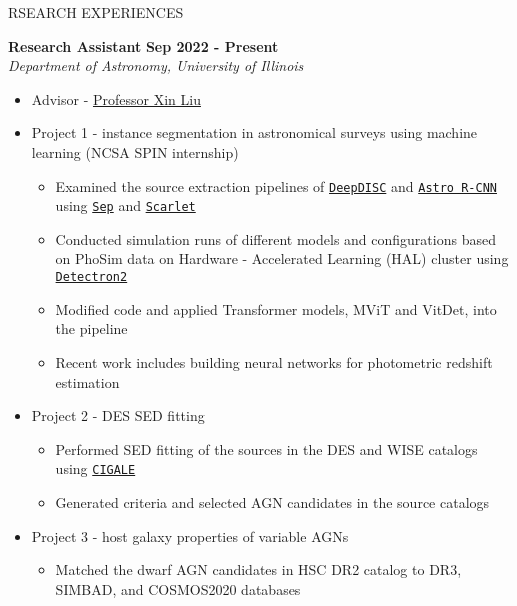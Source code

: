 \documentclass[10pt]{article} %
\begin{document}
\begin{section}{RSEARCH EXPERIENCES}

\textbf{Research Assistant} \hfill \textbf{Sep 2022 - Present} \\
\textit{Department of Astronomy, University of Illinois} 
\begin{itemize}[leftmargin=1.5em]
    \item Advisor - \href{mailto:xinliuxl@illinois.edu}{Professor Xin Liu}
    \item Project 1 - instance segmentation in astronomical surveys using machine learning (NCSA SPIN internship) %
    \begin{itemize}[leftmargin=1.5em]
        \item Examined the source extraction pipelines of \href{https://github.com/burke86/deepdisc}{\texttt{DeepDISC}} and \href{https://github.com/burke86/astro_rcnn}{\texttt{Astro R-CNN}} using \href{https://github.com/kbarbary/sep/tree/v1.1.x}{\texttt{Sep}} and \href{https://github.com/pmelchior/scarlet}{\texttt{Scarlet}}
        \item Conducted simulation runs of different models and configurations based on PhoSim data on Hardware - Accelerated Learning (HAL) cluster using \href{https://github.com/facebookresearch/detectron2}{\texttt{Detectron2}}
        \item Modified code and applied Transformer models, MViT and VitDet, into the pipeline
        \item Recent work includes building neural networks for photometric redshift estimation 
    \end{itemize}
    \item Project 2 - DES SED fitting %
    \begin{itemize}[leftmargin=1.5em]
        \item Performed SED fitting of the sources in the DES and WISE catalogs using \href{https://cigale.lam.fr/}{\texttt{CIGALE}} 
        \item Generated criteria and selected AGN candidates in the source catalogs
    \end{itemize}
    \item Project 3 - host galaxy properties of variable AGNs %
    \begin{itemize}[leftmargin=1.5em]
        \item Matched the dwarf AGN candidates in HSC DR2 catalog to DR3, SIMBAD, and COSMOS2020 databases 

\end{itemize}
\end{itemize}
\end{section}
\end{document}
